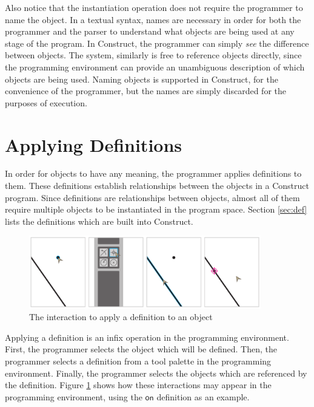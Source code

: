 \documentclass[twoside,openright,11pt]{report}
\begin{document}
Also notice that the instantiation operation does not require the programmer to name the object. 
In a textual syntax, names are necessary in order for both the programmer and the parser to understand what objects are being used at any stage of the program.
In Construct, the programmer can simply {\it see} the difference between objects.
The system, similarly is free to reference objects directly, since the programming environment can provide an unambiguous description of which objects are being used.
Naming objects is supported in Construct, for the convenience of the programmer, but the names are simply discarded for the purposes of execution.

\section{Applying Definitions}
\label{sec:applydef}

In order for objects to have any meaning, the programmer applies definitions to them. 
These definitions establish relationships between the objects in a Construct program. 
Since definitions are relationships between objects, almost all of them require multiple objects to be instantiated in the program space. 
Section \ref{sec:def} lists the definitions which are built into Construct.

\begin{figure}[h]
  \centering
  \includegraphics[width=0.9\textwidth]{definition.pdf}
  \caption{The interaction to apply a definition to an object}
  \label{fig:def-interaction}
\end{figure}

Applying a definition is an infix operation in the programming environment. 
First, the programmer selects the object which will be defined. 
Then, the programmer selects a definition from a tool palette in the programming environment. 
Finally, the programmer selects the objects which are referenced by the definition.
Figure \ref{fig:def-interaction} shows how these interactions may appear in the programming environment, using the $\mathsf{on}$ definition as an example.
\end{document}
